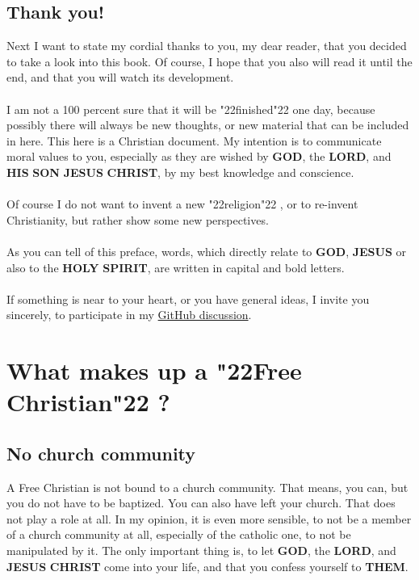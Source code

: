 \documentclass[12pt,a5paper]{article}
\newcommand{\Christ}[0]{\textbf{CHRIST}}
\newcommand{\God}[0]{\textbf{GOD}}
\newcommand{\His}[0]{\textbf{HIS}}
\newcommand{\Holy}[0]{\textbf{HOLY}}
\newcommand{\Jesus}[0]{\textbf{JESUS}}
\newcommand{\Lord}[0]{\textbf{LORD}}
\newcommand{\Son}[0]{\textbf{SON}}
\newcommand{\Spirit}[0]{\textbf{SPIRIT}}
\newcommand{\Them}[0]{\textbf{THEM}}
\newcommand{\q}[1]{\char"22{#1}\char"22 }
\begin{document}
	\subsection{Thank you!}
		Next I want to state my cordial thanks to you,
		my dear reader,
		that you decided to take a look into this book.
		Of course,
		I hope that you also will read it until the end,
		and that you will watch its development.
		\\
		\\
		I am not a 100 percent sure that it will be \q{finished} one day,
		because possibly there will always be new thoughts,
		or new material that can be included in here.
		This here is a Christian document.
		My intention is to communicate moral values to you,
		especially as they are wished by {\God}, the {\Lord},
		and {\His} {\Son} {\Jesus} {\Christ},
		by my best knowledge and conscience.
		\\
		\\
		Of course I do not want to invent a new \q{religion},
		or to re-invent Christianity,
		but rather show some new perspectives.
		\\
		\\
		As you can tell of this preface,
		words,
		which directly relate to {\God},
		{\Jesus} or also to the {\Holy} {\Spirit},
		are written in capital and bold letters.
		\\
		\\
		If something is near to your heart,
		or you have general ideas,
		I invite you sincerely,
		to participate in my  \href{https://github.com/DerRobert-28/Der-Freie-Christ/discussions}{GitHub discussion}.
	

	
	\newpage
	\section{What makes up a \q{Free Christian}?}
	
	\subsection{No church community}
		A Free Christian is not bound to a church community.
		That means,
		you can,
		but you do not have to be baptized.
		You can also have left your church.
		That does not play a role at all.
		In my opinion,
		it is even more sensible,
		to not be a member of a church community at all,
		especially of the catholic one,
		to not be manipulated by it.
		The only important thing is,
		to let {\God},
		the {\Lord},
		and {\Jesus} {\Christ} come into your life,
		and that you confess yourself to {\Them}.
	
\end{document}
